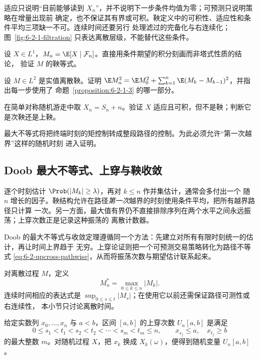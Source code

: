 适应只说明“目前能够读到 $X_n$”，并不说明下一步条件均值为零；可预测只说明策略在增量出现前
确定，也不保证其有界或可积。鞅定义中的可积性、适应性和条件平均三项缺一不可。连续时间还要另行
处理滤过的完备化与右连续化；图~\ref{fig:6-2-1-filtration} 只表达离散层级，不能替代这些条件。

\begin{exercise}
设 $X\in L^1$，$M_n=\E[X\mid\mathcal F_n]$。直接用条件期望的积分刻画而非塔式性质的结论，
验证 $M$ 的鞅等式。
\end{exercise}

\begin{exercise}
设 $M\in L^2$ 是实值离散鞅。证明
$\E M_n^2=\E M_0^2+\sum_{k=1}^n\E(M_k-M_{k-1})^2$，并指出每一步使用了
命题~\ref{proposition:6-2-1-3} 的哪一部分。
\end{exercise}

\begin{exercise}
在简单对称随机游走中取 $X_n=S_n+n$。验证 $X$ 适应且可积，但不是鞅；判断它是次鞅还是上鞅。
\end{exercise}

最大不等式将把终端时刻的矩控制转成整段路径的控制。为此必须允许“第一次越界”这样的随机时刻
进入证明。

\subsection{Doob 最大不等式、上穿与鞅收敛}\label{subsec:6-2-2}

逐个时刻估计 $\Prob(|M_k|\ge\lambda)$，再对 $k\le n$ 作并集估计，通常会多付出一个
随 $n$ 增长的因子。鞅结构允许在路径\emph{第一次}越界的时刻使用条件平均，把所有越界路径只计算
一次。另一方面，最大值有界仍不直接排除序列在两个水平之间永远振荡；上穿次数正是记录这种振荡的
离散计数器。

Doob 的最大不等式与收敛定理遵循同一个方法：先建立对所有有限时刻统一的估计，再让时间上界趋于
无穷。上穿论证则把一个可预测交易策略转化为路径不等式
\eqref{eq:6-2-upcross-pathwise}，从而将振荡次数与期望估计联系起来。

\begin{definition}[最大过程]\label{def:6-2-2-1}
对离散过程 $M$，定义
\[
  M_n^*=\max_{0\le k\le n}|M_k|.
\]
连续时间相应的表达式是 $\sup_{0\le s\le t}|M_s|$；在使用它以前还需保证路径可测性或右连续性，
本小节只讨论离散时间。
\end{definition}

\begin{definition}[上穿次数]\label{def:6-2-2-2}
给定实数列 $x_0,\ldots,x_n$ 与 $a<b$，区间 $[a,b]$ 的上穿次数
$U_n[a,b]$ 是满足
\[
  0\le s_1<t_1<s_2<t_2<\cdots<s_m<t_m\le n,
  \qquad x_{s_j}\le a,\quad x_{t_j}\ge b
\]
的最大整数 $m$。对随机过程 $X$，把 $x_k$ 换成 $X_k(\omega)$，便得到随机变量
$U_n[a,b]$。
\end{definition}

